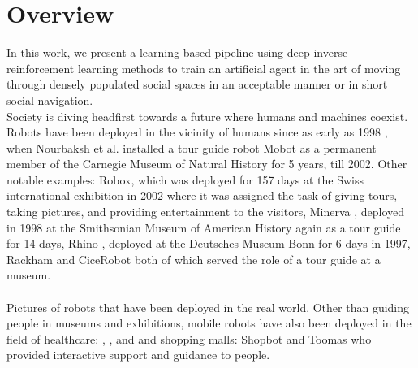 \label{ch:introduction}
\section{Overview}
In this work, we present a learning-based pipeline using deep inverse reinforcement learning methods to train an artificial agent in the art of moving through densely populated social spaces in an acceptable manner or in short social navigation.\\
Society is diving headfirst towards a future where humans and machines coexist. Robots have been deployed in the vicinity of humans since as early as 1998 \cite{Nourbaksh2003Movot}, when Nourbaksh et al. installed a tour guide robot Mobot as a permanent member of the Carnegie Museum of Natural History for 5 years, till 2002. Other notable examples: Robox, \cite{siciliano_robox_2003} which was deployed for 157 days at the Swiss international exhibition in 2002 where it was assigned the task of giving tours, taking pictures, and providing entertainment to the visitors, Minerva \cite{minerva_thrun_2000}, deployed in 1998 at the Smithsonian Museum of American History again as a tour guide for 14 days, Rhino \cite{fox_dynamic_1997}, deployed at the Deutsches Museum Bonn for 6 days in 1997, Rackham \cite{rackham_clodic_2006} and CiceRobot \cite{chella_perception_2009} both of which served the role of a tour guide at a museum.\\
\\Pictures of robots that have been deployed in the real world.
Other than guiding people in museums and exhibitions, mobile robots have also been deployed in the field of healthcare: \cite{pearl_pollack_2002}, \cite{kim_socially_2016}, and \cite{kuderer_feature-based_nodate} and shopping malls: Shopbot \cite{shopbot_kanada} and Toomas \cite{toomas_gross_2009} who provided interactive support and guidance to people. 



